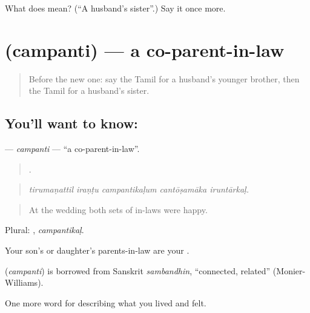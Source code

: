 \begin{tcolorbox}[breakable,colback=teal!4,colframe=teal!35!black,title={Before you move on}]
What does  mean? (\textquotedblleft{}A husband’s sister\textquotedblright{}.) Say it once more.
\end{tcolorbox}
\section[\texorpdfstring{\ta{சம்பந்தி} (campanti)}{சம்பந்தி (campanti)}]{ (campanti) — a co-parent-in-law}

\label{lesson:TA-C493-campanti}



\begin{quote}
Before the new one: say the Tamil for a husband’s younger brother, then the Tamil for a husband’s sister.
\end{quote}

\subsection*{You'll want to know: }
\textbf{} — \emph{campanti} — \textquotedblleft{}a co-parent-in-law\textquotedblright{}.

\begin{quote}
    .
\end{quote}

\begin{quote}
\emph{tirumaṇattil iraṇṭu campantikaḷum cantōṣamāka iruntārkaḷ.}
\end{quote}

\begin{quote}
At the wedding both sets of in-laws were happy.
\end{quote}

Plural: , \emph{campantikaḷ}.

Your son’s or daughter’s parents-in-law are your .

\begin{cousinweb}
\textbf{} (\emph{campanti}) is borrowed from Sanskrit \emph{sambandhin}, \textquotedblleft{}connected, related\textquotedblright{} (Monier-Williams).
\end{cousinweb}

\begin{grammarlens}[title={What you've built}]
One more word for describing what you lived and felt.
\end{grammarlens}

